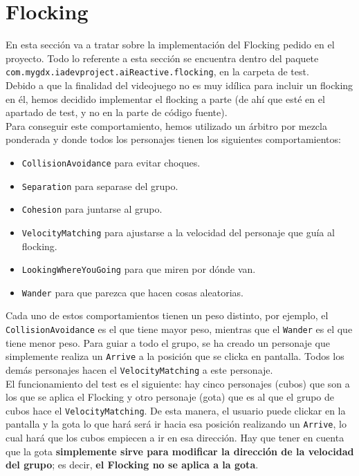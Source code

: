 \medskip
\section{Flocking}
En esta sección va a tratar sobre la implementación del Flocking pedido en el proyecto. Todo lo referente a esta sección se encuentra dentro del paquete \texttt{com.mygdx.iadevproject.aiReactive.flocking}, en la carpeta de test. \\

Debido a que la finalidad del videojuego no es muy idílica para incluir un flocking en él, hemos decidido implementar el flocking a parte (de ahí que esté en el apartado de test, y no en la parte de código fuente). \\

Para conseguir este comportamiento, hemos utilizado un árbitro por mezcla ponderada y donde todos los personajes tienen los siguientes comportamientos:
\begin{itemize}
 \item \texttt{CollisionAvoidance} para evitar choques.
 \item \texttt{Separation} para separase del grupo.
 \item \texttt{Cohesion} para juntarse al grupo.
 \item \texttt{VelocityMatching} para ajustarse a la velocidad del personaje que guía al flocking.
 \item \texttt{LookingWhereYouGoing} para que miren por dónde van.
 \item \texttt{Wander} para que parezca que hacen cosas aleatorias.
\end{itemize}

Cada uno de estos comportamientos tienen un peso distinto, por ejemplo, el \texttt{CollisionAvoidance} es el que tiene mayor peso, mientras que el \texttt{Wander} es el que tiene menor peso. Para guiar a todo el grupo, se ha creado un personaje que simplemente realiza un \texttt{Arrive} a la posición que se clicka en pantalla. Todos los demás personajes hacen el \texttt{VelocityMatching} a este personaje. \\

El funcionamiento del test es el siguiente: hay cinco personajes (cubos) que son a los que se aplica el Flocking y otro personaje (gota) que es al que el grupo de cubos hace el \texttt{VelocityMatching}. De esta manera, el usuario puede clickar en la pantalla y la gota lo que hará será ir hacia esa posición realizando un \texttt{Arrive}, lo cual hará que los cubos empiecen a ir en esa dirección. Hay que tener en cuenta que la gota \textbf{simplemente sirve para modificar la dirección de la velocidad del grupo}; es decir, \textbf{el Flocking no se aplica a la gota}.
